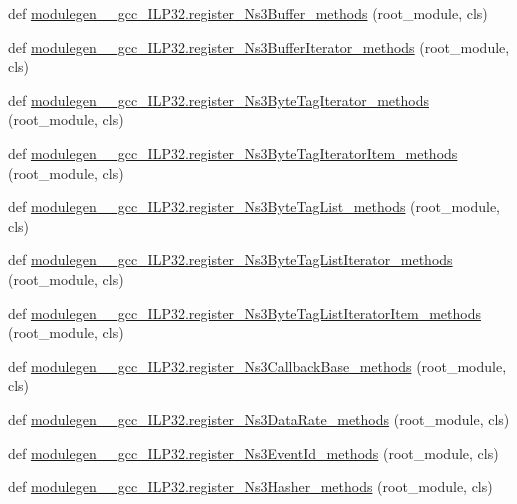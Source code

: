\begin{DoxyCompactItemize}
\item 
def \hyperlink{namespacemodulegen____gcc__ILP32_a03d0a1e8a8592e4ba6f8ede106e1296e}{modulegen\+\_\+\+\_\+gcc\+\_\+\+I\+L\+P32.\+register\+\_\+\+Ns3\+Buffer\+\_\+methods} (root\+\_\+module, cls)
\item 
def \hyperlink{namespacemodulegen____gcc__ILP32_a878cdb9dc61acbc26f4e03349fb4d5ab}{modulegen\+\_\+\+\_\+gcc\+\_\+\+I\+L\+P32.\+register\+\_\+\+Ns3\+Buffer\+Iterator\+\_\+methods} (root\+\_\+module, cls)
\item 
def \hyperlink{namespacemodulegen____gcc__ILP32_ae03f3c65da14af22cebfe1ccadfd8c7d}{modulegen\+\_\+\+\_\+gcc\+\_\+\+I\+L\+P32.\+register\+\_\+\+Ns3\+Byte\+Tag\+Iterator\+\_\+methods} (root\+\_\+module, cls)
\item 
def \hyperlink{namespacemodulegen____gcc__ILP32_a3ebfdd7dfa69d398fc1a31f3343bd057}{modulegen\+\_\+\+\_\+gcc\+\_\+\+I\+L\+P32.\+register\+\_\+\+Ns3\+Byte\+Tag\+Iterator\+Item\+\_\+methods} (root\+\_\+module, cls)
\item 
def \hyperlink{namespacemodulegen____gcc__ILP32_a9d8234bc8a131df2df32c5f735b30ad9}{modulegen\+\_\+\+\_\+gcc\+\_\+\+I\+L\+P32.\+register\+\_\+\+Ns3\+Byte\+Tag\+List\+\_\+methods} (root\+\_\+module, cls)
\item 
def \hyperlink{namespacemodulegen____gcc__ILP32_ae0126e4036279c9c41f9ac4d00a6a681}{modulegen\+\_\+\+\_\+gcc\+\_\+\+I\+L\+P32.\+register\+\_\+\+Ns3\+Byte\+Tag\+List\+Iterator\+\_\+methods} (root\+\_\+module, cls)
\item 
def \hyperlink{namespacemodulegen____gcc__ILP32_a14b17aa2d90542379fe16aec66129b68}{modulegen\+\_\+\+\_\+gcc\+\_\+\+I\+L\+P32.\+register\+\_\+\+Ns3\+Byte\+Tag\+List\+Iterator\+Item\+\_\+methods} (root\+\_\+module, cls)
\item 
def \hyperlink{namespacemodulegen____gcc__ILP32_a0eba0aa92f0bdc57a46a1520487f32d1}{modulegen\+\_\+\+\_\+gcc\+\_\+\+I\+L\+P32.\+register\+\_\+\+Ns3\+Callback\+Base\+\_\+methods} (root\+\_\+module, cls)
\item 
def \hyperlink{namespacemodulegen____gcc__ILP32_a4eb2f9b3d4be750ab50fb46f1e494ed7}{modulegen\+\_\+\+\_\+gcc\+\_\+\+I\+L\+P32.\+register\+\_\+\+Ns3\+Data\+Rate\+\_\+methods} (root\+\_\+module, cls)
\item 
def \hyperlink{namespacemodulegen____gcc__ILP32_a380e15c15390ba7c3f21a3162cb67911}{modulegen\+\_\+\+\_\+gcc\+\_\+\+I\+L\+P32.\+register\+\_\+\+Ns3\+Event\+Id\+\_\+methods} (root\+\_\+module, cls)
\item 
def \hyperlink{namespacemodulegen____gcc__ILP32_a33425c5d69b8b6e93c725709f6aa95fb}{modulegen\+\_\+\+\_\+gcc\+\_\+\+I\+L\+P32.\+register\+\_\+\+Ns3\+Hasher\+\_\+methods} (root\+\_\+module, cls)

\end{DoxyCompactItemize}
